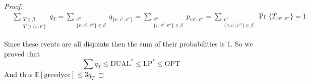 \documentclass[]{article}
\begin{document}
\begin{proof}
	\begin{align*}
	&\sum\limits_{\substack{T\in \beta\\T\supset \{v, v'\}}}q_T = \sum\limits_{\substack{v''\\\{v, v', v''\} \in \beta}} q_{\{v, v', v''\}} = \sum\limits_{\substack{v''\\\{v, v', v''\} \in \beta}} p_{vv', v''} = \sum\limits_{\substack{v''\\\{v, v', v''\} \in \beta}} \Pr\{T_{vv', v''}\} = 1
	\end{align*}
	
	Since these events are all disjoints then the sum of their probabilities is 1. So we proved that
	\[
	\sum q_T \leq \text{DUAL}^* \leq \text{LP}^* \leq \text{OPT}
	\] 
	And thus $ \mathbb{E}[\text{greedycc}] \leq 3q_T $
	
\end{proof}
\end{document}
